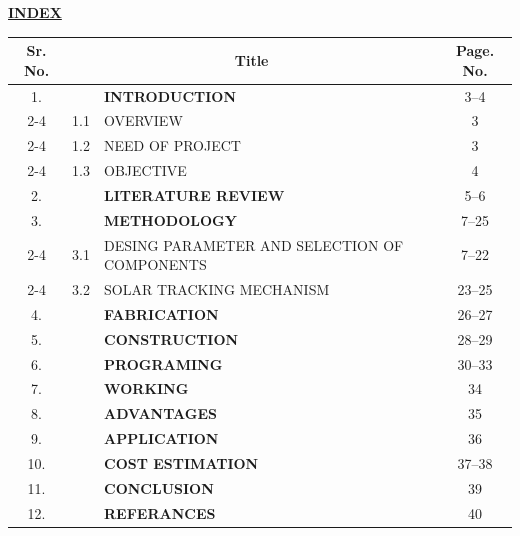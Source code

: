 \setcounter{page}{1}
\pagestyle{fancy}

\vspace*{-2mm}
\begin{center}
  {\fontsize{16}{20}\selectfont \bfseries \textcolor{red!80!black}{\underline{INDEX}}}\\[6mm]
\end{center}

\begin{center}
\renewcommand{\arraystretch}{1.35}
\begin{tabular}{|c|c|l|c|}
\hline
\rowcolor{gray!20}
\textbf{Sr. No.} & \multicolumn{2}{c|}{\textbf{Title}} & \textbf{Page. No.} \\
\hline
1. & & \textbf{INTRODUCTION} & 3--4 \\
\cline{2-4}
   & 1.1 & OVERVIEW & 3 \\
\cline{2-4}
   & 1.2 & NEED OF PROJECT & 3 \\
\cline{2-4}
   & 1.3 & OBJECTIVE & 4 \\
\hline
2. & & \textbf{LITERATURE REVIEW} & 5--6 \\
\hline
3. & & \textbf{METHODOLOGY} & 7--25 \\
\cline{2-4}
   & 3.1 & DESING PARAMETER AND SELECTION OF COMPONENTS & 7--22 \\
\cline{2-4}
   & 3.2 & SOLAR TRACKING MECHANISM & 23--25 \\
\hline
4. & & \textbf{FABRICATION} & 26--27 \\
\hline
5. & & \textbf{CONSTRUCTION} & 28--29 \\
\hline
6. & & \textbf{PROGRAMING} & 30--33 \\
\hline
7. & & \textbf{WORKING} & 34 \\
\hline
8. & & \textbf{ADVANTAGES} & 35 \\
\hline
9. & & \textbf{APPLICATION} & 36 \\
\hline
10. & & \textbf{COST ESTIMATION} & 37--38 \\
\hline
11. & & \textbf{CONCLUSION} & 39 \\
\hline
12. & & \textbf{REFERANCES} & 40 \\
\hline
\end{tabular}
\end{center}
\clearpage
